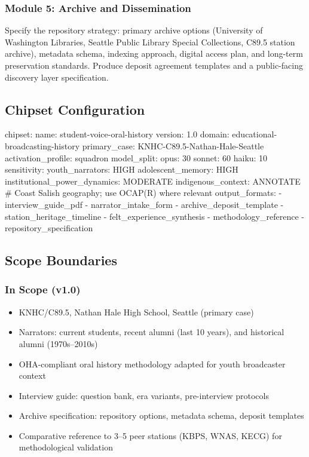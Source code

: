 \documentclass[11pt,letterpaper]{article}
\begin{document}
\subsubsection{Module 5: Archive and Dissemination}
Specify the repository strategy: primary archive options (University of Washington Libraries, Seattle Public Library Special Collections, C89.5 station archive), metadata schema, indexing approach, digital access plan, and long-term preservation standards. Produce deposit agreement templates and a public-facing discovery layer specification.

\subsection{Chipset Configuration}

\begin{asciibox}
chipset:
  name: student-voice-oral-history
  version: 1.0
  domain: educational-broadcasting-history
  primary_case: KNHC-C89.5-Nathan-Hale-Seattle
  activation_profile: squadron
  model_split:
    opus: 30%
    sonnet: 60%
    haiku: 10%
  sensitivity:
    youth_narrators: HIGH
    adolescent_memory: HIGH
    institutional_power_dynamics: MODERATE
    indigenous_context: ANNOTATE  # Coast Salish geography; use OCAP(R) where relevant
  output_formats:
    - interview_guide_pdf
    - narrator_intake_form
    - archive_deposit_template
    - station_heritage_timeline
    - felt_experience_synthesis
    - methodology_reference
    - repository_specification
\end{asciibox}

\subsection{Scope Boundaries}

\subsubsection{In Scope (v1.0)}
\begin{itemize}
  \item KNHC/C89.5, Nathan Hale High School, Seattle (primary case)
  \item Narrators: current students, recent alumni (last 10 years), and historical alumni (1970s--2010s)
  \item OHA-compliant oral history methodology adapted for youth broadcaster context
  \item Interview guide: question bank, era variants, pre-interview protocols
  \item Archive specification: repository options, metadata schema, deposit templates
  \item Comparative reference to 3--5 peer stations (KBPS, WNAS, KECG) for methodological validation
\end{itemize}
\end{document}
